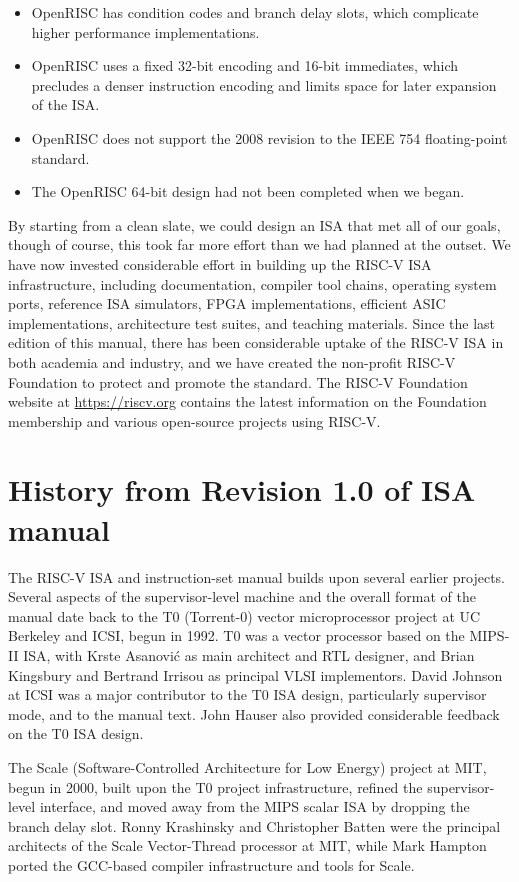 \begin{itemize}
\item OpenRISC has condition codes and branch delay slots, which
  complicate higher performance implementations.
\item OpenRISC uses a fixed 32-bit encoding and 16-bit immediates,
  which precludes a denser instruction encoding and limits space for
  later expansion of the ISA.
\item OpenRISC does not support the 2008 revision to the IEEE 754
  floating-point standard.
\item The OpenRISC 64-bit design had not been completed when we began.
\end{itemize}

By starting from a clean slate, we could design an ISA that met all of
our goals, though of course, this took far more effort than we had
planned at the outset.  We have now invested considerable effort in
building up the RISC-V ISA infrastructure, including documentation,
compiler tool chains, operating system ports, reference ISA
simulators, FPGA implementations, efficient ASIC implementations,
architecture test suites, and teaching materials. Since the last
edition of this manual, there has been considerable uptake of the
RISC-V ISA in both academia and industry, and we have created the
non-profit RISC-V Foundation to protect and promote the standard.  The
RISC-V Foundation website at \url{https://riscv.org} contains the latest
information on the Foundation membership and various open-source
projects using RISC-V.


\section{History from Revision 1.0 of ISA manual}

The RISC-V ISA and instruction-set manual builds upon several earlier
projects.  Several aspects of the supervisor-level machine and the
overall format of the manual date back to the T0 (Torrent-0) vector
microprocessor project at UC Berkeley and ICSI, begun in 1992.  T0 was
a vector processor based on the MIPS-II ISA, with Krste Asanovi\'{c}
as main architect and RTL designer, and Brian Kingsbury and Bertrand
Irrisou as principal VLSI implementors.  David Johnson at ICSI was a
major contributor to the T0 ISA design, particularly supervisor mode,
and to the manual text.  John Hauser also provided considerable
feedback on the T0 ISA design.

The Scale (Software-Controlled Architecture for Low Energy) project at
MIT, begun in 2000, built upon the T0 project infrastructure, refined
the supervisor-level interface, and moved away from the MIPS scalar
ISA by dropping the branch delay slot.  Ronny Krashinsky and
Christopher Batten were the principal architects of the Scale
Vector-Thread processor at MIT, while Mark Hampton ported the
GCC-based compiler infrastructure and tools for Scale.


